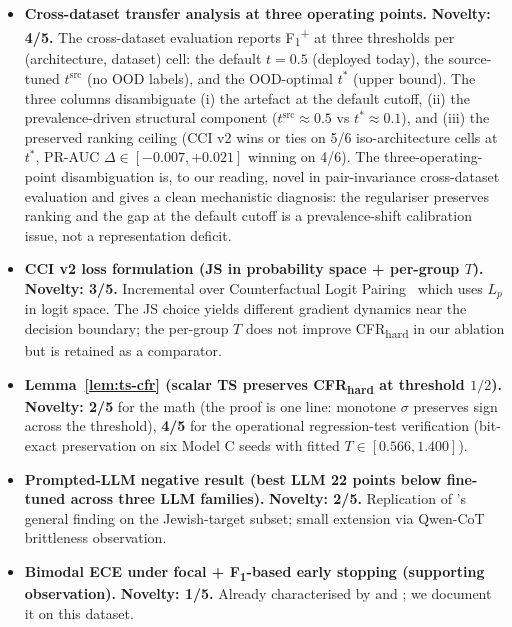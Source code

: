 \documentclass[10pt,a4paper]{article}
\begin{document}
\begin{itemize}[leftmargin=*,itemsep=2pt]
\item \textbf{Cross-dataset transfer analysis at three operating points.}
\textbf{Novelty: 4/5.} The cross-dataset evaluation reports
F\textsubscript{1}\textsuperscript{+} at three thresholds per
(architecture, dataset) cell: the default $t{=}0.5$ (deployed today), the
source-tuned $t^{\mathrm{src}}$ (no OOD labels), and the OOD-optimal
$t^*$ (upper bound). The three columns disambiguate (i) the artefact at
the default cutoff, (ii) the prevalence-driven structural component
($t^{\mathrm{src}}\!\approx\!0.5$ vs $t^*\!\approx\!0.1$), and (iii) the
preserved ranking ceiling (CCI v2 wins or ties on 5/6 iso-architecture
cells at $t^*$, PR-AUC $\Delta \in [-0.007, +0.021]$ winning on 4/6).
The three-operating-point
disambiguation is, to our reading, novel in pair-invariance cross-dataset
evaluation and gives a clean mechanistic diagnosis: the regulariser
preserves ranking and the gap at the default cutoff is a prevalence-shift
calibration issue, not a representation deficit.

\item \textbf{CCI v2 loss formulation (JS in probability space + per-group $T$).}
\textbf{Novelty: 3/5.} Incremental over Counterfactual Logit
Pairing~\citep{garg2019counterfactual,davani2021improving} which uses
$L_p$ in logit space. The JS choice yields different gradient dynamics
near the decision boundary; the per-group $T$ does not improve
CFR\textsubscript{hard} in our ablation but is retained as a comparator.

\item \textbf{Lemma~\ref{lem:ts-cfr} (scalar TS preserves
CFR\textsubscript{hard} at threshold $1/2$).}
\textbf{Novelty: 2/5} for the math (the proof is one line: monotone
$\sigma$ preserves sign across the threshold), \textbf{4/5} for the
operational regression-test verification (bit-exact preservation on six
Model C seeds with fitted $T\in[0.566, 1.400]$).

\item \textbf{Prompted-LLM negative result (best LLM 22 points below
fine-tuned across three LLM families).}
\textbf{Novelty: 2/5.} Replication of \citet{patel2025evaluating}'s
general finding on the Jewish-target subset; small extension via
Qwen-CoT brittleness observation.

\item \textbf{Bimodal ECE under focal + F\textsubscript{1}-based early
stopping (supporting observation).}
\textbf{Novelty: 1/5.} Already characterised by \citet{mukhoti2020calibrating}
and \citet{tao2023pcs}; we document it on this dataset.
\end{itemize}
\end{document}
